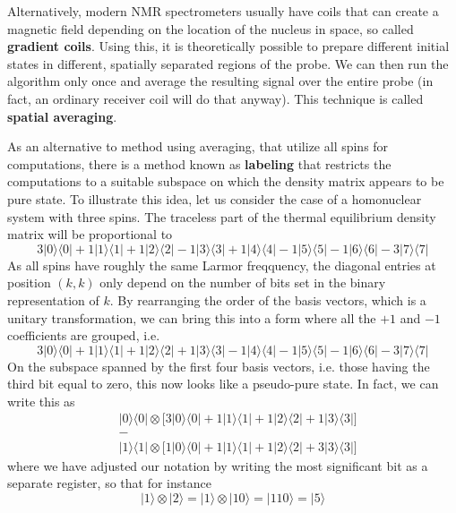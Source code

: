 \documentclass[a4paper, draft]{article}
\theoremstyle{own}
\theoremstyle{remark}
\begin{document}
Alternatively, modern NMR spectrometers usually have coils that can create a magnetic field depending on the location of the nucleus in space, so called {\bf gradient coils}. Using this, it is theoretically possible to prepare different initial states in different, spatially separated regions of the probe. We can then run the algorithm only once and average the resulting signal over the entire probe (in fact, an ordinary receiver coil will do that anyway). This technique is called {\bf spatial averaging}. 

As an alternative to method using averaging, that utilize all spins for computations, there is a method known as {\bf labeling} that restricts the computations to a suitable subspace on which the density matrix appears to be pure state. To illustrate this idea, let us consider the case of a homonuclear system with three spins. The traceless part of the thermal equilibrium density matrix will be proportional to
$$
3 |0 \rangle \langle 0| +
1 |1 \rangle \langle 1| +
1 |2 \rangle \langle 2| -
1  |3 \rangle \langle 3| +
1  |4 \rangle \langle 4| -
1  |5 \rangle \langle 5| -
1  |6 \rangle \langle 6| -
3 |7 \rangle \langle 7|
$$
As all spins have roughly the same Larmor freqquency, the diagonal entries at position $(k,k)$ only depend on the number of bits set in the binary representation of $k$. By rearranging the order of the basis vectors, which is a unitary transformation, we can bring this into a form where all the $+1$ and $-1$ coefficients are grouped, i.e.
$$
3 |0 \rangle \langle 0| +
1 |1 \rangle \langle 1| +
1 |2 \rangle \langle 2| +
1  |3 \rangle \langle 3| -
1  |4 \rangle \langle 4| -
1  |5 \rangle \langle 5| -
1  |6 \rangle \langle 6| -
3 |7 \rangle \langle 7|
$$
On the subspace spanned by the first four basis vectors, i.e. those having the third bit equal to zero, this now looks like a pseudo-pure state. In fact, we can write this as
\begin{align*}
&  |0 \rangle \langle 0 | \otimes \big[ 3 |0 \rangle \langle 0| +
1 |1 \rangle \langle 1| +
1 |2 \rangle \langle 2| +
1  |3 \rangle \langle 3| \big]  \\
& - \\
& |1 \rangle \langle 1 | \otimes \big[ 1 |0 \rangle \langle 0| +
1 |1 \rangle \langle 1| +
1 |2 \rangle \langle 2| +
3  |3 \rangle \langle 3| \big]  
\end{align*}
where we have adjusted our notation by writing the most significant bit as a separate register, so that for instance
$$
|1 \rangle \otimes |2 \rangle = |1 \rangle \otimes |10 \rangle = |110 \rangle = |5\rangle
$$
\end{document}
